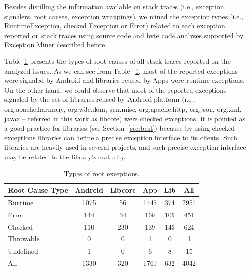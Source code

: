 \documentclass[conference]{IEEEtran}
\begin{document}
Besides distilling the information available on stack traces (i.e., exception signalers, root causes, exception wrappings),
we mined the exception types (i.e., RuntimeException, checked Exception or Error) related to each exception reported on stack traces 
using source code and byte code analyses supported by Exception Miner described before. 

 Table~\ref{tab:typeroottab} presents the types of root causes of all stack traces reported on the analyzed issues. As we can see 
from Table ~\ref{tab:typeroottab},  most of the reported exceptions were signaled by Android and libraries reused by Apps were runtime exceptions. 
On the other hand, we could observe that most of the reported exceptions signaled by the set of 
libraries reused by Android platform (i.e., org.apache.harmony,
org.w3c.dom, sun.misc, org.apache.http, org.json, org.xml, javax -- referred in
this work as libcore) were checked exceptions. It is pointed as a good practice
for libraries (see Section~\ref{sec:best}) because by using checked exceptions
libraries can define a precise exception interface to its clients. Such
libraries are heavily used in several projects, and such precise exception
interface may be related to the library's maturity.

\begin{table}
\centering
\begin{tabular}{lccccc}
    \hline
    \bfseries{Root Cause Type} & \bfseries{Android} & \bfseries{Libcore} & \bfseries{App} & \bfseries{Lib}  & \bfseries{All}\\
    \hline

Runtime	&	1075	&	56	&	1446	&	374	&	2951\\
Error	&	144	&	34	&	168	&	105	&		451	\\
Checked	&	110	&	230	&	139	&	145	&	624	\\
Throwable	&	0	&	0	&	1	&	0	&	1	\\
Undefined	&	1	&	0	&	6	&	8	&	15	\\
    \hline
All		& 1330	&	320	&	1760	&	632	&	4042	\\
    \hline
  \end{tabular}
\caption{Types of root exceptions.}
  \label{tab:typeroottab}
\end{table}

\end{document}
